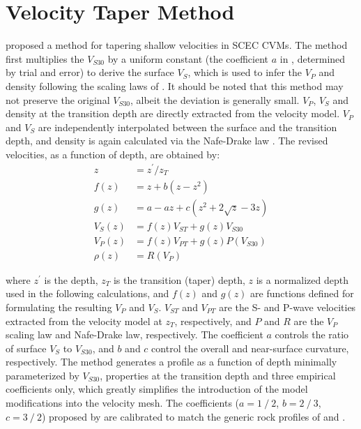 \section{Velocity Taper Method}
\citet{elyVs30derivedNearsurfaceSeismic2010} proposed a method for tapering shallow velocities in SCEC CVMs. The method first multiplies the $V_{S30}$ by a uniform constant (the coefficient $a$ in , determined by trial and error) to derive the surface $V_S$, which is used to infer the $V_P$ and density following the scaling laws of \citet{brocherEmpiricalRelationsElastic2005}. It should be noted that this method may not preserve the original $V_{S30}$, albeit the deviation is generally small. $V_P$, $V_S$ and density at the transition depth are directly extracted from the velocity model. $V_P$ and $V_S$ are independently interpolated between the surface and the transition depth, and density is again calculated via the Nafe-Drake law \citep{ludwigSeismicRefraction1970}. The revised velocities, as a function of depth, are obtained by:
\begin{equation}\label{eq:vs30-2}
  \begin{aligned}
    z        & = z^{\prime} / z_{T}                       \\
    f(z)     & = z+b\left(z-z^{2}\right)                  \\
    g(z)     & = a-a z+c\left(z^{2}+2 \sqrt{z}-3 z\right) \\
    V_{S}(z) & = f(z) V_{S T}+g(z) V_{S 30}               \\
    V_{P}(z) & = f(z) V_{P T}+g(z) P\left(V_{S 30}\right) \\
    \rho(z)  & = R\left(V_{P}\right)
  \end{aligned}
\end{equation}

\noindent where $z^{\prime}$ is the depth, $z_T$ is the transition (taper) depth, $z$ is a normalized depth used in the following calculations, and $f(z)$ and $g(z)$ are functions defined for formulating the resulting $V_P$ and $V_S$. $V_{ST}$ and $V_{PT}$ are the S- and P-wave velocities extracted from the velocity model at $z_T$, respectively, and $P$ and $R$ are the \citet{brocherEmpiricalRelationsElastic2005} $V_P$ scaling law and Nafe-Drake law, respectively. The coefficient $a$ controls the ratio of surface $V_S$ to $V_{S30}$, and $b$ and $c$ control the overall and near-surface curvature, respectively. The method generates a profile as a function of depth minimally parameterized by $V_{S30}$, properties at the transition depth and three empirical coefficients only, which greatly simplifies the introduction of the model modifications into the velocity mesh. The coefficients ($a=1⁄2$, $b=2⁄3$, $c=3⁄2$) proposed by \citet{elyVs30derivedNearsurfaceSeismic2010} are calibrated to match the generic rock profiles of \citet{booreSiteAmplificationsGeneric1997} and \citet{magistraleSCECSouthernCalifornia2000}.

